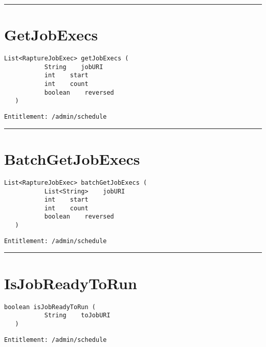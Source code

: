 \rule{12cm}{2pt}
\section{GetJobExecs}
\label{Api:GetJobExecs}
\begin{lstlisting}[style=nonumbers]
   List<RaptureJobExec> getJobExecs (
           String    jobURI
           int    start
           int    count
           boolean    reversed
   )
\end{lstlisting}
\begin{Verbatim}[formatcom=\color{Maroon}]
  Entitlement: /admin/schedule
\end{Verbatim}



\rule{12cm}{2pt}
\section{BatchGetJobExecs}
\label{Api:BatchGetJobExecs}
\begin{lstlisting}[style=nonumbers]
   List<RaptureJobExec> batchGetJobExecs (
           List<String>    jobURI
           int    start
           int    count
           boolean    reversed
   )
\end{lstlisting}
\begin{Verbatim}[formatcom=\color{Maroon}]
  Entitlement: /admin/schedule
\end{Verbatim}



\rule{12cm}{2pt}
\section{IsJobReadyToRun}
\label{Api:IsJobReadyToRun}
\begin{lstlisting}[style=nonumbers]
   boolean isJobReadyToRun (
           String    toJobURI
   )
\end{lstlisting}
\begin{Verbatim}[formatcom=\color{Maroon}]
  Entitlement: /admin/schedule
\end{Verbatim}



